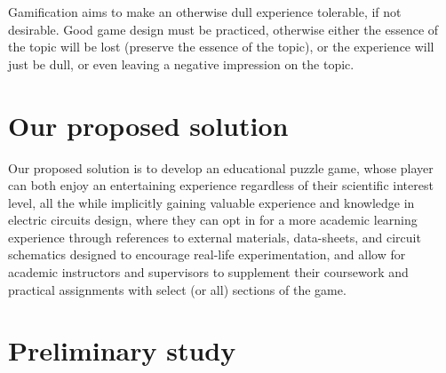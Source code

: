 \documentclass[twoside,a4paper,11pt]{article}
\begin{document}
\begin{multicols}{2}
Gamification aims to make an otherwise dull experience tolerable, if not desirable. Good game design must be practiced, otherwise either the essence of the topic will be lost (preserve the essence of the topic), or the experience will just be dull, or even leaving a negative impression on the topic.

\section{Our proposed solution}

Our proposed solution is to develop an educational puzzle game, whose player can both enjoy an entertaining experience regardless of their scientific interest level, all the while implicitly gaining valuable experience and knowledge in electric circuits design, where they can opt in for a more academic learning experience through references to external materials, data-sheets, and circuit schematics designed to encourage real-life experimentation, and allow for academic instructors and supervisors to supplement their coursework and practical assignments with select (or all) sections of the game.
\section{Preliminary study}

\end{multicols}
\end{document}
